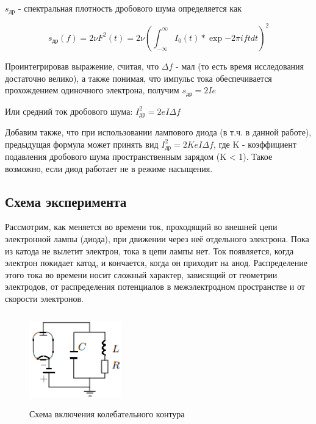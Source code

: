 \documentclass[12pt,a4paper]{article}
\begin{document}
\par $s_\text{др}$ - спектральная плотность дробового шума определяется как 

\begin{equation}
s_\text{др}(f) = 2\nu{F^2(t)} = 2\nu(\int_{-\infty}^{\infty}{I_0(t)*\exp{-2\pi{i}ft}dt})^2
\end{equation}

\par Проинтегрировав выражение, считая, что $\Delta{f}$ - мал (то есть время исследования достаточно велико), а также понимая, что импульс тока обеспечивается прохождением одиночного электрона, получим $s_\text{др} = 2Ie$

\par Или средний ток дробового шума: $I_\text{др}^2=2eI\Delta{f} $ 

\par Добавим также, что при использовании лампового диода (в т.ч. в данной работе), предыдущая формула может принять вид $I_\text{др}^2=2KeI\Delta{f}$, где K - коэффициент подавления дробового шума пространственным зарядом (K < 1). Такое возможно, если диод работает не в режиме насыщения.

\subsection{Схема эксперимента}

\par Рассмотрим, как меняется во времени ток, проходящий во внешней цепи электронной лампы (диода), при движении через неё отдельного электрона. Пока из катода не вылетит электрон, тока в цепи лампы нет. Ток появляется, когда электрон покидает катод, и кончается, когда он приходит на анод. Распределение этого тока во времени носит сложный характер, зависящий от геометрии электродов, от распределения потенциалов в межэлектродном пространстве и от скорости электронов.

\begin{figure}
	\vspace{-4ex}
	\includegraphics[width=4cm, height=4cm]{VPV-3_1}
	\caption{Схема включения колебательного контура}
	\label{img1}
\end{figure}	 
\end{document}
